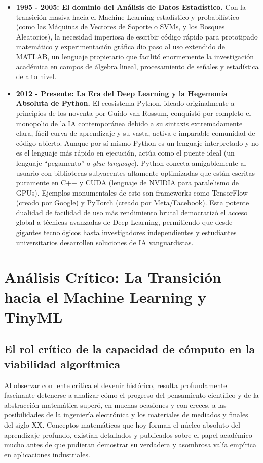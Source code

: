 \documentclass[12pt,letterpaper]{article}
\begin{document}
\begin{itemize}
    \item \textbf{1995 - 2005: El dominio del Análisis de Datos Estadístico.} Con la transición masiva hacia el Machine Learning estadístico y probabilístico (como las Máquinas de Vectores de Soporte o SVMs, y los Bosques Aleatorios), la necesidad imperiosa de escribir código rápido para prototipado matemático y experimentación gráfica dio paso al uso extendido de MATLAB, un lenguaje propietario que facilitó enormemente la investigación académica en campos de álgebra lineal, procesamiento de señales y estadística de alto nivel.
    
    \item \textbf{2012 - Presente: La Era del Deep Learning y la Hegemonía Absoluta de Python.} El ecosistema Python, ideado originalmente a principios de los noventa por Guido van Rossum, conquistó por completo el monopolio de la IA contemporánea debido a su sintaxis extremadamente clara, fácil curva de aprendizaje y su vasta, activa e imparable comunidad de código abierto. Aunque por sí mismo Python es un lenguaje interpretado y no es el lenguaje más rápido en ejecución, actúa como el puente ideal (un lenguaje ``pegamento'' o \textit{glue language}). Python conecta amigablemente al usuario con bibliotecas subyacentes altamente optimizadas que están escritas puramente en C++ y CUDA (lenguaje de NVIDIA para paralelismo de GPUs). Ejemplos monumentales de esto son frameworks como TensorFlow (creado por Google) y PyTorch (creado por Meta/Facebook). Esta potente dualidad de facilidad de uso más rendimiento brutal democratizó el acceso global a técnicas avanzadas de Deep Learning, permitiendo que desde gigantes tecnológicos hasta investigadores independientes y estudiantes universitarios desarrollen soluciones de IA vanguardistas.
\end{itemize}

\newpage
\section{Análisis Crítico: La Transición hacia el Machine Learning y TinyML}

\subsection{El rol crítico de la capacidad de cómputo en la viabilidad algorítmica}
Al observar con lente crítica el devenir histórico, resulta profundamente fascinante detenerse a analizar cómo el progreso del pensamiento científico y de la abstracción matemática superó, en muchas ocasiones y con creces, a las posibilidades de la ingeniería electrónica y los materiales de mediados y finales del siglo XX. Conceptos matemáticos que hoy forman el núcleo absoluto del aprendizaje profundo, existían detallados y publicados sobre el papel académico mucho antes de que pudieran demostrar su verdadera y asombrosa valía empírica en aplicaciones industriales. 
\end{document}
